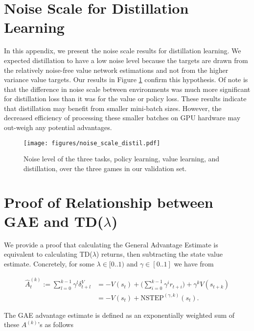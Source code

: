 \documentclass{article}
\begin{document}
\clearpage

\section{Noise Scale for Distillation Learning}
\label{app:distil_noise}

In this appendix, we present the noise scale results for distillation learning. We expected distillation to have a low noise level because the targets are drawn from the relatively noise-free value network estimations and not from the higher variance value targets. Our results in Figure \ref{fig:distil_noise} confirm this hypothesis. Of note is that the difference in noise scale between environments was much more significant for distillation loss than it was for the value or policy loss. These results indicate that distillation may benefit from smaller mini-batch sizes. However, the decreased efficiency of processing these smaller batches on GPU hardware may out-weigh any potential advantages.

\begin{figure}[h]
    \centering
    \texttt{[image: figures/noise\_scale\_distil.pdf]}
    \caption{Noise level of the three tasks, policy learning, value learning, and distillation, over the three games in our validation set.}
    \label{fig:distil_noise}
\end{figure}

\section{Proof of Relationship between GAE and TD($\lambda$)}
\label{app:td}

We provide a proof that calculating the General Advantage Estimate \cite{schulman2015high} is equivalent to calculating TD($\lambda$) returns, then subtracting the state value estimate. Concretely, for some $\lambda \in [0..1)$ and $\gamma \in [0..1]$ we have from \cite{schulman2015high}

\begin{align}
    \hat{A}_t^{(k)} := \sum^{k-1}_{l=0} \gamma^l\delta^V_{t+l} &= -V(s_t) + \Big( \sum_{i=0}^{k-1} \gamma^i r_{t+i} \Big) + \gamma^k V(s_{t+k})\\
    &= -V(s_t) + \text{NSTEP}^{(\gamma, k)}(s_t).
\end{align}

The GAE advantage estimate is defined as an exponentially weighted sum of these $A^{(k)}$'s as follows
\end{document}
